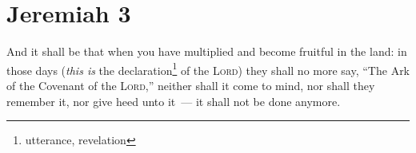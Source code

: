 \section{Jeremiah 3}\label{Jeremiah 3}
\begin{enumerate}
     And it shall be that when you have multiplied and become fruitful in the land: in those days (\emph{this is} the declaration\footnote{utterance, revelation} of the \textsc{Lord}) they shall no more say, ``The Ark of the Covenant of the \textsc{Lord},'' neither shall it come to mind, nor shall they remember it, nor give heed unto it~--- it shall not be done anymore.%
\end{enumerate}
